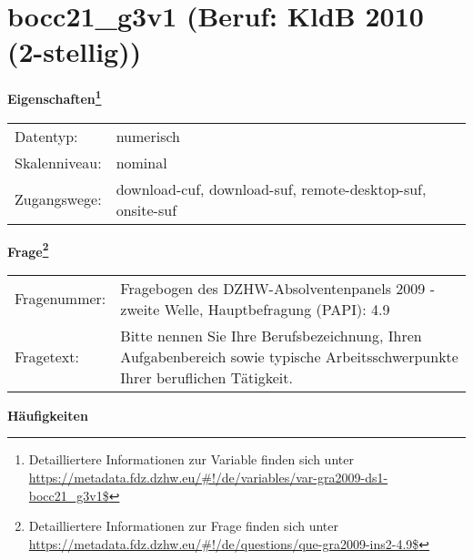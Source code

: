 
    \setcounter{footnote}{0}

    \vspace*{-1.8cm}
	\section{bocc21\_g3v1 (Beruf: KldB 2010 (2-stellig))}
	\label{section:bocc21_g3v1}



    \vspace*{0.5cm}
    \noindent\textbf{Eigenschaften\footnote{Detailliertere Informationen zur Variable finden sich unter
		\url{https://metadata.fdz.dzhw.eu/\#!/de/variables/var-gra2009-ds1-bocc21_g3v1$}}}\\
	\begin{tabularx}{\hsize}{@{}lX}
	Datentyp: & numerisch \\
	Skalenniveau: & nominal \\
	Zugangswege: &
	  download-cuf, 
	  download-suf, 
	  remote-desktop-suf, 
	  onsite-suf
 \\
    \end{tabularx}



				\vspace*{0.5cm}
                \noindent\textbf{Frage\footnote{Detailliertere Informationen zur Frage finden sich unter
		              \url{https://metadata.fdz.dzhw.eu/\#!/de/questions/que-gra2009-ins2-4.9$}}}\\
				\begin{tabularx}{\hsize}{@{}lX}
					Fragenummer: &
					  Fragebogen des DZHW-Absolventenpanels 2009 - zweite Welle, Hauptbefragung (PAPI):
					  4.9
 \\
					Fragetext: & Bitte nennen Sie Ihre Berufsbezeichnung, Ihren Aufgabenbereich sowie typische Arbeitsschwerpunkte Ihrer beruflichen Tätigkeit. \\
				\end{tabularx}





        		\vspace*{0.5cm}
                \noindent\textbf{Häufigkeiten}

